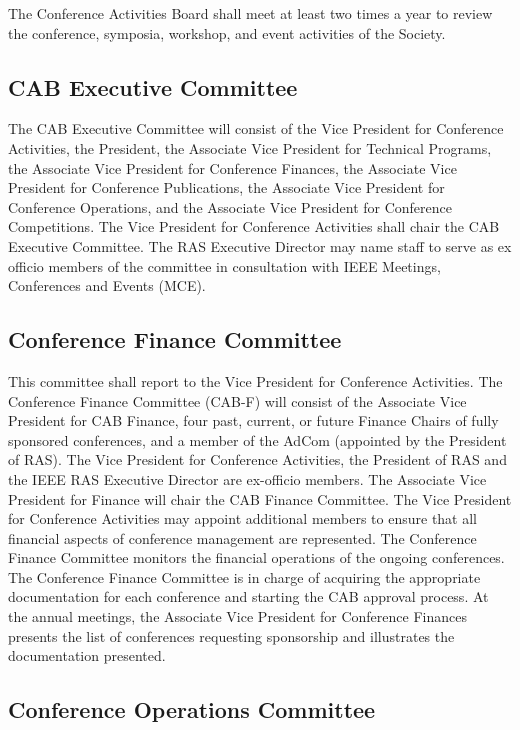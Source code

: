\documentclass[10pt]{article}
\begin{document}
The Conference Activities Board shall meet at least two times a year to review the conference, symposia, workshop, and event activities of the Society.


\subsection{CAB Executive Committee}
\label{CAB:ExCom}

The CAB Executive Committee will consist of the Vice President for Conference Activities, the President, the Associate Vice President for Technical Programs, the Associate Vice President for Conference Finances, the Associate Vice President for Conference Publications, the Associate Vice President for Conference Operations, and the Associate Vice President for Conference Competitions. The Vice President for Conference Activities shall chair the CAB Executive Committee. The RAS Executive Director may name staff to serve as ex officio members of the committee in consultation with IEEE Meetings, Conferences and Events (MCE).


\subsection{Conference Finance Committee}

This committee shall report to the Vice President for Conference Activities. The Conference Finance Committee (CAB-F) will consist of the Associate Vice President for CAB Finance, four past, current, or future Finance Chairs of fully sponsored conferences, and a member of the AdCom (appointed by the President of RAS).   The Vice President for Conference Activities, the President of RAS and the IEEE RAS Executive Director are ex-officio members. The Associate Vice President for Finance will chair the CAB Finance Committee. The Vice President for Conference Activities may appoint additional members to ensure that all financial aspects of conference management are represented. The Conference Finance Committee monitors the financial operations of the ongoing conferences. The Conference Finance Committee is in charge of acquiring the appropriate documentation for each conference and starting the CAB approval process. At the annual meetings, the Associate Vice President for Conference Finances presents the list of conferences requesting sponsorship and illustrates the documentation presented.

\subsection{Conference Operations Committee}
\end{document}
